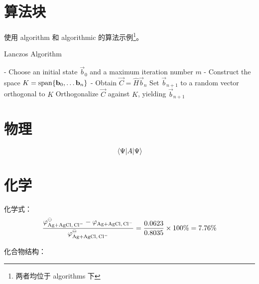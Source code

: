 \section{算法块}

使用 {algorithm} 和 {algorithmic} 的算法示例\footnote{两者均位于 \textsf{algorithms} 下}。

\begin{algorithm}[htbp]
    \caption{Lanczos Algorithm}
    \begin{algorithmic}
        \STATE - Choose an initial state $\vec{b}_0$ and a maximum iteration number $m$
        \STATE - Construct the space $K = \operatorname{span}\{\mathbf{b}_0 , \ldots \mathbf{b}_n \}$
        \STATE - Obtain $\vec{C} = \hat{H} \vec{b}_n$
        \STATE Set $\vec{b}_{n+1}$ to a random vector orthogonal to $K$
        \ELSE
        \STATE Orthogonalize $\vec{C}$ against $K$, yielding $\vec{b}_{n+1}$
        \ENDIF\ENDFOR
    \end{algorithmic}
\end{algorithm}


\section{物理}

\begin{equation}
    \expval{A}{\Psi}
\end{equation}


\section{化学}

化学式：
\begin{equation}
    \frac{\varphi_{\ce{Ag +AgCl, Cl^{-}}}^{\ominus}-\varphi_{\ce{Ag +AgCl, Cl^{-}}}}{\varphi_{\ce{Ag +AgCl, Cl^{-}}}^{\ominus}}=\frac{0.0623}{0.8035}\times100\%=7.76\%
\end{equation}

化合物结构：
\begin{figure}[H]
  \centering
\end{figure}